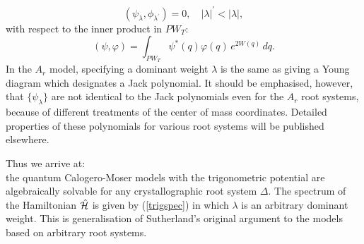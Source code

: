 \documentclass[a4paper,12pt]{article}
\begin{document}
\begin{equation}
(\psi_{\lambda},\phi_{\lambda^\prime})=0,\quad |\lambda|^\prime<
|\lambda|,
\end{equation}
with respect to the inner product in $PW_T$:
\begin{equation}
(\psi,\varphi)=\int_{PW_T}\psi^*(q)\varphi(q)\,e^{2W(q)}\,dq.
\end{equation}
In the \(A_r\) model, specifying a dominant weight $\lambda$ is the same
as giving a Young diagram which designates a Jack polynomial.
It should be emphasised, however, that $\{\psi_{\lambda}\}$ are not
identical to the Jack polynomials even for the $A_r$ root systems,
because of  different
treatments of the center of mass coordinates.
 Detailed properties of these polynomials for
various root systems will be
published elsewhere.

\bigskip
Thus we arrive at:\\
the quantum Calogero-Moser models with the trigonometric potential  are
algebraically solvable for any crystallographic
root system \(\Delta\). The spectrum of the Hamiltonian \(\hat{\cal H}\)
is given by (\ref{trigspec})
in which \(\lambda\) is an arbitrary dominant weight.
This is generalisation of Sutherland's original argument \cite{Sut} to
the models based on arbitrary root systems.
\end{document}
